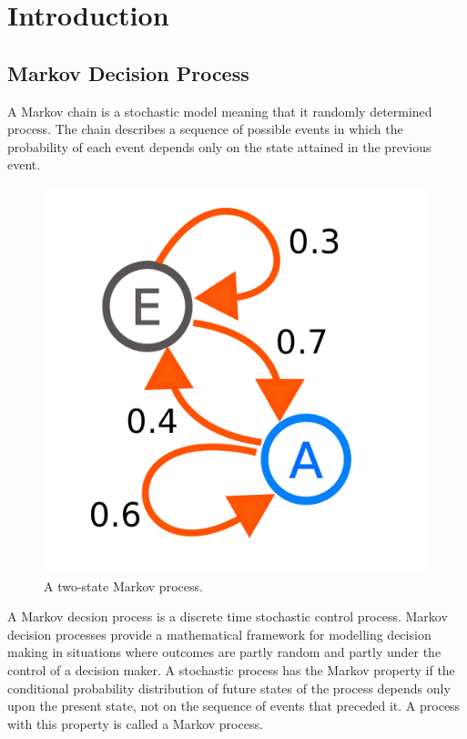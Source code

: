 \documentclass[]{article}
\title{}
\author{}
\begin{document}
	
\maketitle

\section{Introduction}

\subsection{Markov Decision Process}

A Markov chain is a stochastic model meaning that it randomly determined process. The chain describes a sequence of possible events in which the probability of each event depends only on the state attained in the previous event. 

\begin{figure}[H]
	\includegraphics[scale=0.1]{markov}
	\centering
	\caption{A two-state Markov process.}
\end{figure}

A Markov decsion process is a discrete time stochastic control process. Markov decision processes provide a mathematical framework for modelling decision making in situations where outcomes are partly random and partly under the control of a decision maker. A stochastic process has the Markov property if the conditional probability distribution of future states of the process depends only upon the present state, not on the sequence of events that preceded it. A process with this property is called a Markov process.
\end{document}

